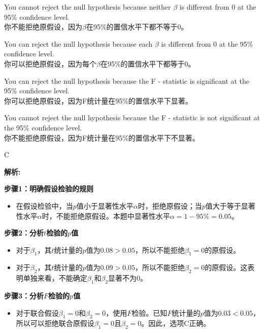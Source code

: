 \documentclass{article}
\newenvironment{explanation}
{\textbf{解析:}\par}
{\par}
\begin{document}
    \begin{choices}
        \item You cannot reject the null hypothesis because neither \(\beta\) is different from 0 at the 95\% confidence level.\\
        你不能拒绝原假设，因为\(\beta\)在95\%的置信水平下都不等于0。
        \item You can reject the null hypothesis because each \(\beta\) is different from 0 at the 95\% confidence level.\\
        你可以拒绝原假设，因为每个\(\beta\)在95\%的置信水平下都等于0。
        \item You can reject the null hypothesis because the F - statistic is significant at the 95\% confidence level.\\
        你可以拒绝原假设，因为F统计量在95\%的置信水平下显著。
        \item You cannot reject the null hypothesis because the F - statistic is not significant at the 95\% confidence level.\\
        你不能拒绝原假设，因为F统计量在95\%的置信水平下不显著。
    \end{choices}
    
    \begin{correctanswer}
        C
    \end{correctanswer}
    
    \begin{explanation}
    \textbf{步骤1：明确假设检验的规则}
    \begin{itemize}
    \item 在假设检验中，当\(p\)值小于显著性水平\(\alpha\)时，拒绝原假设；当\(p\)值大于等于显著性水平\(\alpha\)时，不能拒绝原假设。本题中显著性水平\(\alpha = 1 - 95\%=0.05\)。
    \end{itemize}
    \textbf{步骤2：分析\(t\)检验的\(p\)值}
    \begin{itemize}
    \item 对于\(\beta_1\)，其\(t\)统计量的\(p\)值为\(0.08 > 0.05\)，所以不能拒绝\(\beta_1 = 0\)的原假设。
    \item 对于\(\beta_2\)，其\(t\)统计量的\(p\)值为\(0.09 > 0.05\)，所以不能拒绝\(\beta_2 = 0\)的原假设。这表明单独来看，不能确定\(\beta_1\)和\(\beta_2\)显著不为\(0\)。
    \end{itemize}
    \textbf{步骤3：分析\(F\)检验的\(p\)值}
    \begin{itemize}
    \item 对于联合假设\(\beta_1 = 0\)和\(\beta_2 = 0\)，使用\(F\)检验。已知\(F\)统计量的\(p\)值为\(0.03 < 0.05\)，所以可以拒绝联合原假设\(\beta_1 = 0\)且\(\beta_2 = 0\)。因此，选项C正确。
    \end{itemize}
    
    \end{explanation}
    
\end{document}
